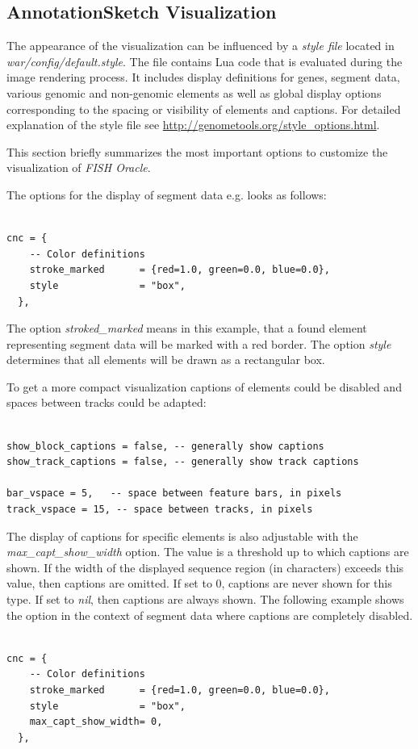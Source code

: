 \documentclass[11pt,final]{article}
\newcommand{\FO}[0]{\emph{FISH Oracle}\xspace}
\begin{document}
\subsection{AnnotationSketch Visualization}

The appearance of the visualization can be influenced by a \emph{style file}
located in \textit{war/config/default.style}. The file contains Lua code that
is evaluated during the image rendering process. It includes display
definitions for genes, segment data, various genomic and non-genomic elements
as well as global display options corresponding to the spacing or visibility
of elements and captions. For detailed explanation of the style file see
\url{http://genometools.org/style_options.html}.

This section briefly summarizes the most important options to customize the
visualization of \FO.

The options for the display of segment data e.g. looks as follows:
\begin{verbatim}

cnc = {
    -- Color definitions
    stroke_marked      = {red=1.0, green=0.0, blue=0.0},
    style              = "box",
  },

\end{verbatim}

The option \textit{stroked\_marked} means in this example, that a found element
representing segment data will be marked with a red border. The option
\textit{style} determines that all elements will be drawn as a rectangular
box.

To get a more compact visualization captions of elements could be disabled
and spaces between tracks could be adapted:

\begin{verbatim}

show_block_captions = false, -- generally show captions
show_track_captions = false, -- generally show track captions

bar_vspace = 5,   -- space between feature bars, in pixels
track_vspace = 15, -- space between tracks, in pixels

\end{verbatim}

The display of captions for specific elements is also adjustable with the
\textit{max\_capt\_show\_width} option. The value is a threshold up to which
captions are shown. If the width of the displayed sequence region
(in characters) exceeds this value, then captions are omitted. If set to 0,
captions are never shown for this type. If set to \textit{nil}, then captions are
always shown.
The following example shows the option in the context of segment data where
captions are completely disabled.

\begin{verbatim}

cnc = {
    -- Color definitions
    stroke_marked      = {red=1.0, green=0.0, blue=0.0},
    style              = "box",
    max_capt_show_width= 0,
  },


\end{verbatim}

\end{document}

